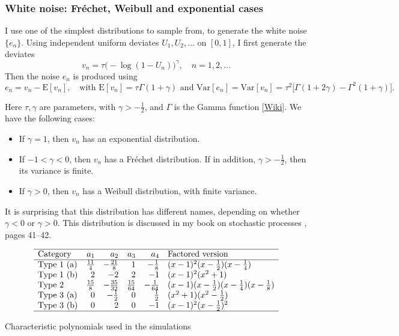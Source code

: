 \documentclass[oneside,10pt]{book}
\renewcommand{\arraystretch}{1.4} %
\begin{document}
\subsubsection{White noise: Fréchet, Weibull and exponential cases}

I use one of the simplest distributions to sample from, to generate the white noise $\{e_n\}$. Using independent uniform deviates $U_1,U_2,\dots$ on $[0, 1]$, I first generate the deviates
\begin{equation}\label{eq1lin}
v_n=\tau\Big(-\log(1-U_n)\Big)^\gamma, \quad n=1,2,\dots
\end{equation}
Then the noise $e_n$ is produced using
$$e_n=v_n-\text{E}[v_n],\quad \text{with } \text{E}[v_n]=\tau\Gamma(1+\gamma) \text{ and }
\text{Var}[e_n] = \text{Var}[v_n]= \tau^2\Big[\Gamma(1+2\gamma)-\Gamma^2(1+\gamma)\Big].$$

\noindent Here $\tau,\gamma$ are parameters, with $\gamma>-\frac{1}{2}$, and $\Gamma$ is the \textcolor{index}{Gamma function} [\href{https://en.wikipedia.org/wiki/Gamma_function}{Wiki}]. We have the following cases:
\begin{itemize}
\item If $\gamma=1$, then $v_n$ has an exponential distribution.
\item If $-1<\gamma<0$, then $v_n$ has a \textcolor{index}{Fréchet distribution}. If in addition, $\gamma>-\frac{1}{2}$, then its variance is finite.
\item If $\gamma>0$, then $v_n$ has a \textcolor{index}{Weibull distribution}, with finite variance.
\end{itemize}
It is surprising that this distribution has different names, depending on whether $\gamma<0$ or $\gamma>0$. This distribution is discussed in my book
on stochastic processes \cite{vgsimulnew}, pages 41--42.

\renewcommand{\arraystretch}{1.4} %
\begin{table}[H]
\[
\begin{array}{lrrrrl}
\hline
  \text{Category} & a_1 & a_2  & a_3 & a_4  & \text{Factored version}\\
\hline
\text{Type 1 (a)}	&	\frac{11}{4}	&	-\frac{21}{8}	&	1 & -\frac{1}{8}	&	(x-1)^2(x-\frac{1}{2})(x-\frac{1}{4}) \\
\text{Type 1 (b)}	&	2	&	-2	&	2	&	-1	&	(x-1)^2(x^2+1)\\
\text{Type 2}	&	\frac{15}{8}	& -\frac{35}{32} & \frac{15}{64} & -\frac{1}{64} &	(x-1)(x-\frac{1}{2})(x-\frac{1}{4})(x-\frac{1}{8}) \\
\text{Type 3 (a)}	&	0	&	-\frac{1}{2}	&	0	&	\frac{1}{2}	&	(x^2+1)(x^2-\frac{1}{2}) \\
\text{Type 3 (b)} 	&	0	&	2	&	0	&	-1	&	(x-1)^2(x-\frac{1}{2})^2\\
\hline
\end{array}
\]
\caption{\label{tablin1} Characteristic polynomials used in the simulations}
\end{table}
\renewcommand{\arraystretch}{1.0} %
\end{document}
